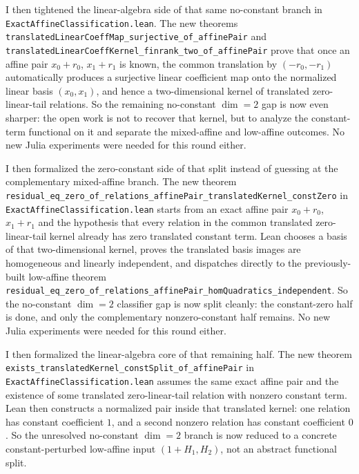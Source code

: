\documentclass[11pt]{article}
\begin{document}
I then tightened the linear-algebra side of that same no-constant branch in
\texttt{ExactAffineClassification.lean}. The new theorems
\texttt{translatedLinearCoeffMap\_surjective\_of\_affinePair} and
\texttt{translatedLinearCoeffKernel\_finrank\_two\_of\_affinePair} prove that
once an affine pair \(x_0 + r_0\), \(x_1 + r_1\) is known, the common
translation by \((-r_0,-r_1)\) automatically produces a surjective linear
coefficient map onto the normalized linear basis \((x_0,x_1)\), and hence a
two-dimensional kernel of translated zero-linear-tail relations. So the
remaining no-constant \(\dim=2\) gap is now even sharper: the open work is not
to recover that kernel, but to analyze the constant-term functional on it and
separate the mixed-affine and low-affine outcomes. No new Julia experiments
were needed for this round either.

I then formalized the zero-constant side of that split instead of guessing at
the complementary mixed-affine branch. The new theorem
\texttt{residual\_eq\_zero\_of\_relations\_affinePair\_translatedKernel\_constZero}
in \texttt{ExactAffineClassification.lean} starts from an exact affine pair
\(x_0+r_0\), \(x_1+r_1\) and the hypothesis that every relation in the common
translated zero-linear-tail kernel already has zero translated constant term.
Lean chooses a basis of that two-dimensional kernel, proves the translated
basis images are homogeneous and linearly independent, and dispatches directly
to the previously-built low-affine theorem
\texttt{residual\_eq\_zero\_of\_relations\_affinePair\_homQuadratics\_independent}.
So the no-constant \(\dim=2\) classifier gap is now split cleanly: the
constant-zero half is done, and only the complementary nonzero-constant half
remains. No new Julia experiments were needed for this round either.

I then formalized the linear-algebra core of that remaining half. The new
theorem \texttt{exists\_translatedKernel\_constSplit\_of\_affinePair} in
\texttt{ExactAffineClassification.lean} assumes the same exact affine pair and
the existence of some translated zero-linear-tail relation with nonzero
constant term. Lean then constructs a normalized pair inside that translated
kernel: one relation has constant coefficient \(1\), and a second nonzero
relation has constant coefficient \(0\). So the unresolved no-constant
\(\dim=2\) branch is now reduced to a concrete constant-perturbed low-affine
input \((1+H_1, H_2)\), not an abstract functional split.
\end{document}
